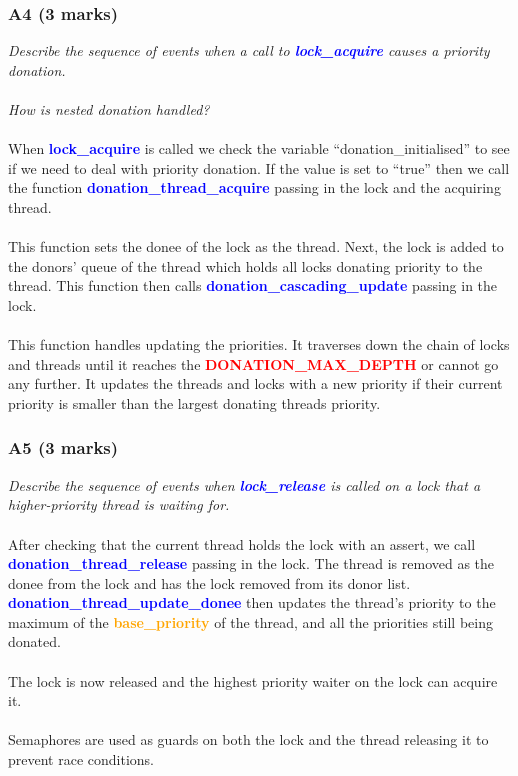 \documentclass{report}
\newcommand{\question}[1]{\textit{#1} \\ }
\newcommand{\fun}[1]{\textcolor{blue}{\textbf{#1}}}
\newcommand{\struct}[1]{\textcolor{orange}{\textbf{#1}}}
\newcommand{\const}[1]{\textcolor{red}{\textbf{#1}}}
\begin{document}
                \subsubsection*{A4  (3 marks)}
                    \question{Describe the sequence of events when a call to \fun{lock\_acquire} causes a priority donation. 
                    \\
                    \\How is nested donation handled?} 
                    \\
                    When \fun{lock\_acquire} is called we check the variable “donation\_initialised” to see if we need to deal with 
                    priority donation. If the value is set to “true” then we call the function \fun{donation\_thread\_acquire} 
                    passing in the lock and the acquiring thread. 
                    \\ 
                    \\ This function sets the donee of the lock as the thread. 
                    Next, the lock is added to the donors' queue of the thread which holds all locks donating priority to 
                    the thread.  This function then calls \fun{donation\_cascading\_update} passing in the lock. 
                    \\ 
                    \\ This function 
                    handles updating the priorities. It traverses down the chain of locks and threads until it reaches the 
                    \const{DONATION\_MAX\_DEPTH} or cannot go any further. It updates the threads and locks with a new priority if 
                    their current priority is smaller than the largest donating threads priority.                    
                \subsubsection*{A5  (3 marks)}
                    \question{Describe the sequence of events when \fun{lock\_release} is called on a lock that a higher-priority thread is waiting for.} 
                    \\ After checking that the current thread holds the lock with an assert, we call \fun{donation\_thread\_release} 
                    passing in the lock. The thread is removed as the donee from the lock and has the lock removed from its donor list.
                    \\ 
                    \fun{donation\_thread\_update\_donee} then updates the thread's priority to the maximum of the \struct{base\_priority} of the thread, and all the priorities still being donated.
                    \\ 
                    \\ The lock is now released and the highest priority waiter on the lock can acquire it.
                    \\
                    \\ Semaphores are used as guards on both the lock and the thread releasing it to prevent race conditions.
\end{document}
